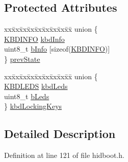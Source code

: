 \subsection*{\-Protected \-Attributes}
\begin{DoxyCompactItemize}
\item 
\begin{tabbing}
xx\=xx\=xx\=xx\=xx\=xx\=xx\=xx\=xx\=\kill
union \{\\
\>\hyperlink{struct_k_b_d_i_n_f_o}{KBDINFO} \hyperlink{class_keyboard_report_parser_ab62ffa0e72677379d1e68538625f2f28}{kbdInfo}\\
\>uint8\_t \hyperlink{class_keyboard_report_parser_a65e6da24b038be3095d06e13b4a280ba}{bInfo} \mbox{[}sizeof(\hyperlink{struct_k_b_d_i_n_f_o}{KBDINFO})\mbox{]}\\
\} \hyperlink{class_keyboard_report_parser_af11da7bfeaff2505a36aa68abb0984f1}{prevState}\\

\end{tabbing}\item 
\begin{tabbing}
xx\=xx\=xx\=xx\=xx\=xx\=xx\=xx\=xx\=\kill
union \{\\
\>\hyperlink{struct_k_b_d_l_e_d_s}{KBDLEDS} \hyperlink{class_keyboard_report_parser_aa867ab4b6898efa9b768bd05f275809c}{kbdLeds}\\
\>uint8\_t \hyperlink{class_keyboard_report_parser_ae910089ecc7caff18429925affc5dc7f}{bLeds}\\
\} \hyperlink{class_keyboard_report_parser_a8a8bd1a171e6b17d1c6db04cedeeff44}{kbdLockingKeys}\\

\end{tabbing}\end{DoxyCompactItemize}


\subsection{\-Detailed \-Description}


\-Definition at line 121 of file hidboot.\-h.



